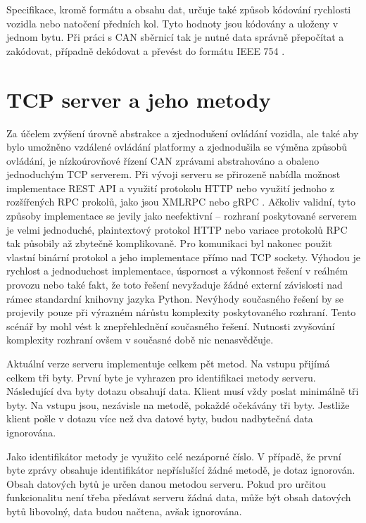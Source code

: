 \documentclass[czech, bachelor]{diploma}
\begin{document}
Specifikace, kromě formátu a obsahu dat, určuje také způsob kódování rychlosti vozidla nebo natočení předních kol. Tyto hodnoty
jsou kódovány a uloženy v jednom bytu. Při práci s CAN sběrnicí tak je nutné data správně přepočítat a zakódovat, případně
dekódovat a převést do formátu IEEE 754 \cite{floating-point-source}.

\section{TCP server a jeho metody} \label{server-methods}

Za účelem zvýšení úrovně abstrakce a zjednodušení ovládání vozidla, ale také aby bylo umožněno vzdálené ovládání platformy
a zjednodušila se výměna způsobů ovládání, je nízkoúrovňové řízení CAN zprávami abstrahováno a obaleno jednoduchým TCP serverem.
Při vývoji serveru se přirozeně nabídla možnost implementace REST API \cite{rest-source} a využití protokolu HTTP \cite{
http-source} nebo využití jednoho z rozšířených RPC prokolů, jako jsou XMLRPC \cite{xmlrpc-source} nebo gRPC \cite{grpc-source}.
Ačkoliv validní, tyto způsoby implementace se jevily jako neefektivní -- rozhraní poskytované serverem je velmi jednoduché,
plaintextový protokol HTTP nebo variace protokolů RPC tak působily až zbytečně komplikovaně. Pro komunikaci byl nakonec použit
vlastní binární protokol a jeho implementace přímo nad TCP sockety. Výhodou je rychlost a jednoduchost implementace, úspornost
a výkonnost řešení v reálném provozu nebo také fakt, že toto řešení nevyžaduje žádné externí závislosti nad rámec standardní
knihovny jazyka Python. Nevýhody současného řešení by se projevily pouze při výrazném nárůstu komplexity poskytovaného rozhraní.
Tento scénář by mohl vést k znepřehlednění současného řešení. Nutnosti zvyšování komplexity rozhraní ovšem v současné době nic
nenasvědčuje.

Aktuální verze serveru implementuje celkem pět metod. Na vstupu přijímá celkem tři byty. První byte je vyhrazen pro identifikaci
metody serveru. Následující dva byty dotazu obsahují data. Klient musí vždy poslat minimálně tři byty. Na vstupu jsou, nezávisle
na metodě, pokaždé očekávány tři byty. Jestliže klient pošle v dotazu více než dva datové byty, budou nadbytečná data ignorována.

Jako identifikátor metody je využito celé nezáporné číslo. V případě, že první byte zprávy obsahuje identifikátor nepříslušící
žádné metodě, je dotaz ignorován. Obsah datových bytů je určen danou metodou serveru. Pokud pro určitou funkcionalitu není třeba
předávat serveru žádná data, může být obsah datových bytů libovolný, data budou načtena, avšak ignorována.
\end{document}
